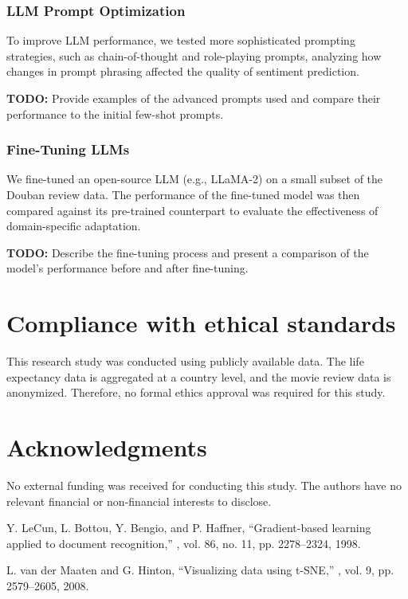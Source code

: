\documentclass{article}
\begin{document}
\subsubsection{LLM Prompt Optimization}
To improve LLM performance, we tested more sophisticated prompting strategies, such as chain-of-thought and role-playing prompts, analyzing how changes in prompt phrasing affected the quality of sentiment prediction.

\textbf{TODO:} Provide examples of the advanced prompts used and compare their performance to the initial few-shot prompts.

\subsubsection{Fine-Tuning LLMs}
We fine-tuned an open-source LLM (e.g., LLaMA-2) on a small subset of the Douban review data. The performance of the fine-tuned model was then compared against its pre-trained counterpart to evaluate the effectiveness of domain-specific adaptation.

\textbf{TODO:} Describe the fine-tuning process and present a comparison of the model's performance before and after fine-tuning.


\section{Compliance with ethical standards}
\label{sec:ethics}
This research study \cite{LeCun98} was conducted using publicly available data. The life expectancy data is aggregated at a country level, and the movie review data is anonymized. Therefore, no formal ethics approval was required for this study.

\section{Acknowledgments}
\label{sec:acknowledgments}
No external funding was received for conducting this study. The authors have no relevant financial or non-financial interests to disclose.


% 
\begin{thebibliography}{99}

  Y. LeCun, L. Bottou, Y. Bengio, and P. Haffner,
  \newblock ``Gradient-based learning applied to document recognition,''
  , vol. 86, no. 11, pp. 2278--2324, 1998.
  
  L. van der Maaten and G. Hinton,
  \newblock ``Visualizing data using t-SNE,''
  , vol. 9, pp. 2579--2605, 2008.
  
  \end{thebibliography}
\end{document}
